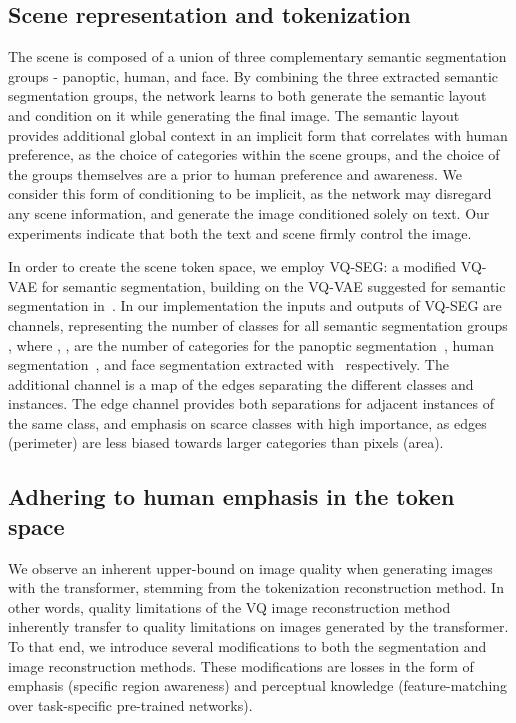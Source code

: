 \documentclass[final]{cvpr}
\begin{document}
\subsection{Scene representation and tokenization}
The scene is composed of a union of three complementary semantic segmentation groups - panoptic, human, and face.
By combining the three extracted semantic segmentation groups, the network learns to both generate the semantic layout and condition on it while generating the final image. The semantic layout provides additional global context in an implicit form that correlates with human preference, as the choice of categories within the scene groups, and the choice of the groups themselves are a prior to human preference and awareness. We consider this form of conditioning to be implicit, as the network may disregard any scene information, and generate the image conditioned solely on text. Our experiments indicate that both the text and scene firmly control the image.

In order to create the scene token space, we employ VQ-SEG: a modified VQ-VAE for semantic segmentation, building on the VQ-VAE suggested for semantic segmentation in~\cite{esser2021taming}. 
In our implementation the inputs and outputs of VQ-SEG are  channels, representing the number of classes for all semantic segmentation groups , where , ,  are the number of categories for the panoptic segmentation~\cite{wu2019detectron2}, human segmentation~\cite{li2020self}, and face segmentation extracted with~\cite{bulat2017far} respectively. The additional channel is a map of the edges separating the different classes and instances. The edge channel provides both separations for adjacent instances of the same class, and emphasis on scarce classes with high importance, as edges (perimeter) are less biased towards larger categories than pixels (area).

\subsection{Adhering to human emphasis in the token space}
We observe an inherent upper-bound on image quality when generating images with the transformer, stemming from the tokenization reconstruction method. In other words, quality limitations of the VQ image reconstruction method inherently transfer to quality limitations on images generated by the transformer. To that end, we introduce several modifications to both the segmentation and image reconstruction methods. These modifications are losses in the form of emphasis (specific region awareness) and perceptual knowledge (feature-matching over task-specific pre-trained networks). 
\end{document}

